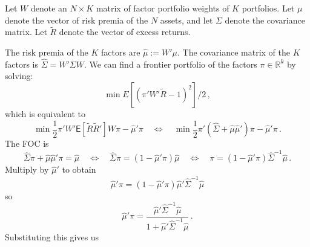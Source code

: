 \documentclass[12pt]{scrarticle}
\theoremstyle{plain}
\numberwithin{lemma}{section}
\numberwithin{proposition}{section}
\numberwithin{equation}{section}
\numberwithin{figure}{section}
\newcommand{\mye}{\ensuremath{\mathsf{E}}}
\begin{document}
Let $W$ denote an $N \times K$ matrix of factor portfolio weights of $K$ portfolios. Let $\mu$ denote the vector of risk premia of the $N$ assets, and let $\Sigma$ denote the covariance matrix.  Let $\tilde R$ denote the vector of excess returns.  

The risk premia of the $K$ factors are $\hat \mu := W'\mu$.  The covariance matrix of the $K$ factors is $\widehat \Sigma = W'\Sigma W$.  We can find a frontier portfolio of the factors $\pi \in \mathbb{R}^k$ by solving: 
$$\min E[(\pi'W'\tilde R - 1)^2]/2\,,$$
which is equivalent to
$$\min \frac{1}{2} \pi' W'\mye[\tilde R \tilde R'] W\pi - \hat \mu'\pi \quad \Leftrightarrow \quad \min \frac{1}{2}\pi'(\widehat \Sigma + \hat \mu \hat \mu')\pi - \hat \mu'\pi\,.$$
The FOC is 
$$\widehat \Sigma \pi + \hat \mu \hat \mu'\pi = \hat \mu \quad \Leftrightarrow \quad \hat \Sigma \pi = (1- \hat \mu'\pi)\hat \mu \quad \Leftrightarrow \quad \pi = (1-\hat \mu'\pi)\widehat\Sigma^{-1}\hat\mu\,.$$
Multiply by $\hat \mu'$ to obtain
$$\hat\mu'\pi = (1-\hat\mu'\pi)\hat\mu'\widehat\Sigma^{-1}\hat\mu$$
so
$$\hat\mu'\pi = \frac{\hat\mu'\widehat\Sigma^{-1}\hat\mu}{1+\hat\mu'\widehat\Sigma^{-1}\hat\mu}\,.$$
Substituting this gives us
\end{document}
